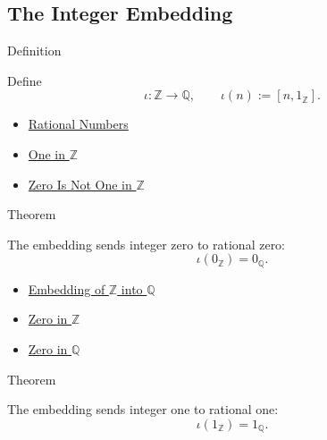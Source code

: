 \subsection*{The Integer Embedding}

\begin{definitionbox}{Definition}
\begin{definition}
\label{def:rational-chapter-embedding-z-into-q}
Define
\[
\iota:\mathbb{Z}\to\mathbb{Q},
\qquad
\iota(n):=[n,1_{\mathbb{Z}}].
\]
\end{definition}
\end{definitionbox}

\begin{dependencies}
\begin{itemize}
  \item \hyperref[def:rationals]{Rational Numbers}
  \item \hyperref[def:one-in-z]{One in $\mathbb{Z}$}
  \item \hyperref[thm:zero-not-one-in-z]{Zero Is Not One in $\mathbb{Z}$}
\end{itemize}
\end{dependencies}

\begin{theorembox}{Theorem}
\begin{theorem}
\label{thm:embedding-z-into-q-preserves-zero}
The embedding sends integer zero to rational zero:
\[
\iota(0_{\mathbb{Z}})=0_{\mathbb{Q}}.
\]
\end{theorem}
\end{theorembox}

\begin{dependencies}
\begin{itemize}
  \item \hyperref[def:rational-chapter-embedding-z-into-q]{Embedding of $\mathbb{Z}$ into $\mathbb{Q}$}
  \item \hyperref[def:zero-in-z]{Zero in $\mathbb{Z}$}
  \item \hyperref[def:zero-in-q]{Zero in $\mathbb{Q}$}
\end{itemize}
\end{dependencies}

\begin{theorembox}{Theorem}
\begin{theorem}
\label{thm:embedding-z-into-q-preserves-one}
The embedding sends integer one to rational one:
\[
\iota(1_{\mathbb{Z}})=1_{\mathbb{Q}}.
\]
\end{theorem}
\end{theorembox}

